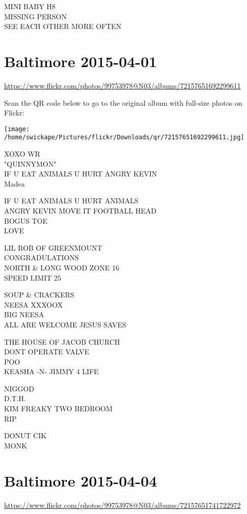 \documentclass[10pt,letterpaper]{article}
\begin{document}
MINI BABY H8\\
MISSING PERSON\\
SEE EACH OTHER MORE OFTEN


\section*{Baltimore 2015-04-01}

\url{https://www.flickr.com/photos/99753978@N03/albums/72157651692299611}

Scan the QR code below to go to the original album with full-size photos on Flickr:

\texttt{[image: /home/swickape/Pictures/flickr/Downloads/qr/72157651692299611.jpg]}


XOXO WR\\
"QUINNYMON"\\
IF U EAT ANIMALS U HURT ANGRY KEVIN\\
Madea

IF U EAT ANIMALS U HURT ANIMALS\\
ANGRY KEVIN MOVE IT FOOTBALL HEAD\\
BOGUS TOE\\
LOVE

LIL ROB OF GREENMOUNT\\
CONGRADULATIONS\\
NORTH \& LONG WOOD ZONE 16\\
SPEED LIMIT 25

SOUP \& CRACKERS\\
NEESA XXXOOX\\
BIG NEESA\\
ALL ARE WELCOME JESUS SAVES

THE HOUSE OF JACOB CHURCH\\
DONT OPERATE VALVE\\
POO\\
KEASHA {-}N{-} JIMMY 4 LIFE

NIGGOD\\
D.T.H.\\
KIM FREAKY TWO BEDROOM\\
RIP

DONUT CIK\\
MONK


\section*{Baltimore 2015-04-04}

\url{https://www.flickr.com/photos/99753978@N03/albums/72157651741722972}
\end{document}

